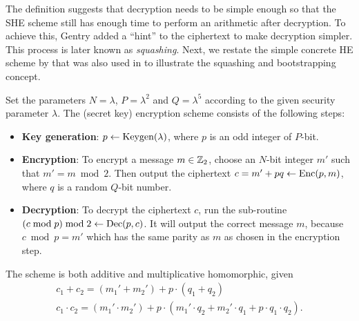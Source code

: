 \documentclass[../main.tex]{subfiles}
\begin{document}
The definition suggests that decryption needs to be simple enough so that the SHE scheme still has enough time to perform an arithmetic after decryption. To achieve this, Gentry added a ``hint'' to the ciphertext to make decryption simpler. This process is later known as \textit{squashing}. Next, we restate the simple concrete HE scheme by \cite{dijk2010fully} that was also used in \cite{gentry2010computing} to illustrate the squashing and bootstrapping concept. 

Set the parameters $N=\lambda$, $P=\lambda^2$ and $Q=\lambda^5$ according to the given security parameter $\lambda$. The (secret key) encryption scheme consists of the following steps:%
\begin{itemize}
    \item \textbf{Key generation}: $p \leftarrow \text{Keygen}(\lambda)$, where $p$ is an odd integer of $P$-bit. 
    
    \item \textbf{Encryption}: To encrypt a message $m \in \mathbb{Z}_2$, choose an $N$-bit integer $m'$ such that $m'=m \bmod 2$. Then output the ciphertext $c=m'+pq \leftarrow \text{Enc}(p,m)$, where $q$ is a random $Q$-bit number.
    
    \item \textbf{Decryption}: To decrypt the ciphertext $c$, run the sub-routine $(c \bmod p) \bmod 2 \leftarrow \text{Dec}(p, c)$. It will output the correct message $m$, because $c \bmod p = m'$ which has the same parity as $m$ as chosen in the encryption step. 
\end{itemize}
The scheme is both additive and multiplicative homomorphic, given %
\begin{gather*}
  c_1+c_2=(m_1'+m_2')+p \cdot (q_1+q_2) \\
  c_1 \cdot c_2 = (m_1' \cdot m_2') + p \cdot (m_1' \cdot q_2 + m_2' \cdot q_1 + p \cdot q_1 \cdot q_2).
\end{gather*}  

\end{document}
